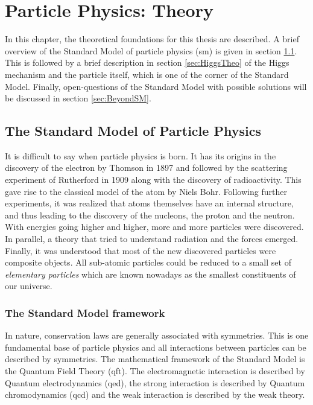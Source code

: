 \chapter{Particle Physics: Theory}
\label{chap:Theory}

In this chapter, the theoretical foundations for this thesis are described. A brief overview of the Standard Model of particle physics (\acrshort{sm}) is given in section \ref{sec:SM}. This is followed by a brief description in section \ref{sec:HiggsTheo} of the Higgs mechanism and the particle itself, which is one of the corner of the Standard Model. Finally, open-questions of the Standard Model with possible solutions will be discussed in section \ref{sec:BeyondSM}.

\section{The Standard Model of Particle Physics}
\label{sec:SM}

It is difficult to say when particle physics is born. It has its origins in the discovery of the electron by Thomson \cite{JJThomson:1897} in 1897 and followed by the scattering experiment of Rutherford \cite{Rutherford:1911} in 1909 along with the discovery of radioactivity. This gave rise to the classical model of the atom by Niels Bohr. Following further experiments, it was realized that atoms themselves have an internal structure, and thus leading to the discovery of the nucleons, the proton and the neutron. With energies going higher and higher, more and more particles were discovered. In parallel, a theory that tried to understand radiation and the forces emerged. Finally, it was understood that most of the new discovered particles were composite objects. All sub-atomic particles could be reduced to a small set of \textit{elementary particles} which are known nowadays as the smallest constituents of our universe.

\subsection{The Standard Model framework}

In nature, conservation laws are generally associated with symmetries. This is one fundamental base of particle physics and all interactions between particles can be described by symmetries. The mathematical framework of the Standard Model is the Quantum Field Theory (\acrshort{qft}). The electromagnetic interaction is described by Quantum electrodynamics (\acrshort{qed}), the strong interaction is described by Quantum chromodynamics (\acrshort{qcd}) and the weak interaction is described by the weak theory.

